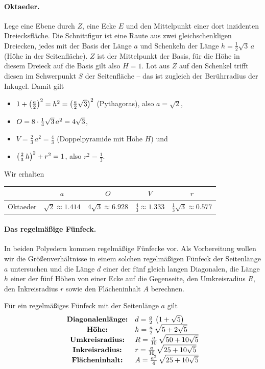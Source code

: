 \documentclass[11pt]{article}
\begin{document}
\paragraph{Oktaeder.}
Lege eine Ebene durch $Z$, eine Ecke $E$ und den Mittelpunkt einer dort
inzidenten Dreiecksfläche. Die Schnittfigur ist eine Raute aus zwei
gleichschenkligen Dreiecken, jedes mit der Basis der Länge $a$ und Schenkeln
der Länge $h=\frac12\sqrt{3}\,a$ (Höhe in der Seitenfläche). $Z$ ist der
Mittelpunkt der Basis, für die Höhe in diesem Dreieck auf die Basis gilt also
$H=1$.  Lot aus $Z$ auf den Schenkel trifft diesen im Schwerpunkt $S$ der
Seitenfläche -- das ist zugleich der Berührradius der Inkugel. Damit gilt
\newpage
\begin{itemize}
\item $1+\left(\frac{a}{2}\right)^2=h^2=\left(\frac{a}{2}\sqrt{3}\right)^2$ (Pythagoras), also
  $a=\sqrt{2}$,
\item $O=8\cdot\frac14\sqrt{3}\,a^2=4\sqrt{3}$, 
\item $V=\frac23\,a^2=\frac43$ (Doppelpyramide mit Höhe $H$) und 
\item $\left(\frac23\,h\right)^2+r^2=1$, also $r^2=\frac13$.
\end{itemize}
Wir erhalten 
\begin{center}
  \begin{tabular}{|l|c|c|c|c|}\hline
    & $a$ & $O$ & $V$ & $r$ \\\hline
    Oktaeder & $\sqrt{2}\approx 1.414$ & $4\sqrt{3}\approx 6.928$ &
    $\frac43 \approx 1.333$ & $\frac13\sqrt{3} \approx 0.577$ \\\hline
  \end{tabular}
\end{center}

\paragraph{Das regelmäßige Fünfeck.}
In beiden Polyedern kommen regelmäßige Fünfecke vor. Als Vorbereitung wollen
wir die Größenverhältnisse in einem solchen regelmäßigen Fünfeck der
Seitenlänge $a$ untersuchen und die Länge $d$ einer der fünf gleich langen
Diagonalen, die Länge $h$ einer der fünf Höhen von einer Ecke auf die
Gegenseite, den Umkreisradius $R$, den Inkreisradius $r$ sowie den
Flächeninhalt $A$ berechnen.

\begin{satz}
  Für ein regelmäßiges Fünfeck mit der Seitenlänge $a$ gilt
  \begin{gather*}
    \begin{array}{cl}    
      \text{\bf Diagonalenlänge:} & d=\frac{a}{2}\,\left(1+\sqrt{5}\right)\\
      \text{\bf Höhe:} & h=\frac{a}{2}\,\sqrt{5+2\sqrt{5}}\\
      \text{\bf Umkreisradius:} & R=\frac{a}{10}\,\sqrt{50+10\sqrt{5}}\\
      \text{\bf Inkreisradius:} & r=\frac{a}{10}\,\sqrt{25+10\sqrt{5}}\\
      \text{\bf Flächeninhalt:} & A=\frac{a^2}{4}\,\sqrt{25+10\sqrt{5}}
    \end{array}
  \end{gather*}
\end{satz}
\end{document}
